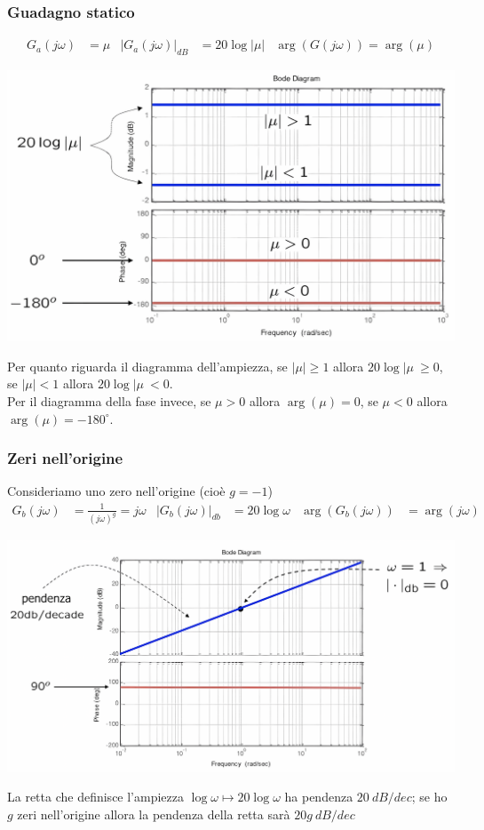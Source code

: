 \documentclass{article}
\numberwithin{equation}{subsection}
\begin{document}
\subsubsection{Guadagno statico}
\begin{align*}
    G_a(j\omega) &=\mu & |G_a(j\omega)|_{dB} &= 20\log|\mu| & \arg(G(j\omega)) = \arg(\mu)
\end{align*}
\begin{center}
    \includegraphics[scale=0.125]{Images/Diagramma_guadagno_statico_1.png}
\end{center}
Per quanto riguarda il diagramma dell'ampiezza, se $|\mu| \geq 1$ allora $20\log|\mu\ \geq 0$, se $|\mu| <1$ allora $20\log|\mu\ < 0$.\\
Per il diagramma della fase invece, se $\mu >0$ allora $\arg(\mu)=0$, se $\mu <0$ allora $\arg(\mu)=-180^\circ$.


\subsubsection{Zeri nell'origine}
Consideriamo uno zero nell'origine (cioè $g=-1$)
\begin{align*}
    G_b(j\omega) &= \frac{1}{(j\omega)^g} = j\omega & |G_b(j\omega)|_{db} &= 20 \log \omega & \arg(G_b(j \omega)) &= \arg(j\omega)
\end{align*}
\begin{center}
    \includegraphics[scale=0.125]{Images/Diagramma_zero_origine.png}
\end{center}
La retta che definisce l'ampiezza $\log \omega \mapsto 20 \log \omega$ ha pendenza $20 \ dB/dec$; se ho $g$ zeri nell'origine allora la pendenza della retta sarà $20g \ dB/dec$
\end{document}
